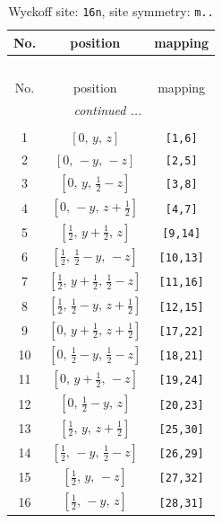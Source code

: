 \documentclass[fleqn,8pt]{jsarticle}
\begin{document}
\renewcommand{\arraystretch}{1.2}
\begin{longtable}{ccc}
\caption{Wyckoff site: {\tt 16n}, site symmetry: {\tt m..}}
 \\
 \hline \hline
No. & position & mapping \\ \hline \endfirsthead

\multicolumn{2}{l}{\tablename\ \thetable{}} \\
 \hline \hline
No. & position & mapping \\ \hline \endhead

 \hline \hline
\multicolumn{2}{r}{\footnotesize\it continued ...} \\ \endfoot

 \hline \hline
\multicolumn{2}{r}{} \\ \endlastfoot

1 & $\left[ 0,\, y,\, z \right]$ & {\tt [1,6]} \\ \hline
2 & $\left[ 0,\, - y,\, - z \right]$ & {\tt [2,5]} \\ \hline
3 & $\left[ 0,\, y,\, \frac{1}{2} - z \right]$ & {\tt [3,8]} \\ \hline
4 & $\left[ 0,\, - y,\, z + \frac{1}{2} \right]$ & {\tt [4,7]} \\ \hline
5 & $\left[ \frac{1}{2},\, y + \frac{1}{2},\, z \right]$ & {\tt [9,14]} \\ \hline
6 & $\left[ \frac{1}{2},\, \frac{1}{2} - y,\, - z \right]$ & {\tt [10,13]} \\ \hline
7 & $\left[ \frac{1}{2},\, y + \frac{1}{2},\, \frac{1}{2} - z \right]$ & {\tt [11,16]} \\ \hline
8 & $\left[ \frac{1}{2},\, \frac{1}{2} - y,\, z + \frac{1}{2} \right]$ & {\tt [12,15]} \\ \hline
9 & $\left[ 0,\, y + \frac{1}{2},\, z + \frac{1}{2} \right]$ & {\tt [17,22]} \\ \hline
10 & $\left[ 0,\, \frac{1}{2} - y,\, \frac{1}{2} - z \right]$ & {\tt [18,21]} \\ \hline
11 & $\left[ 0,\, y + \frac{1}{2},\, - z \right]$ & {\tt [19,24]} \\ \hline
12 & $\left[ 0,\, \frac{1}{2} - y,\, z \right]$ & {\tt [20,23]} \\ \hline
13 & $\left[ \frac{1}{2},\, y,\, z + \frac{1}{2} \right]$ & {\tt [25,30]} \\ \hline
14 & $\left[ \frac{1}{2},\, - y,\, \frac{1}{2} - z \right]$ & {\tt [26,29]} \\ \hline
15 & $\left[ \frac{1}{2},\, y,\, - z \right]$ & {\tt [27,32]} \\ \hline
16 & $\left[ \frac{1}{2},\, - y,\, z \right]$ & {\tt [28,31]} \\
\end{longtable}
\end{document}
